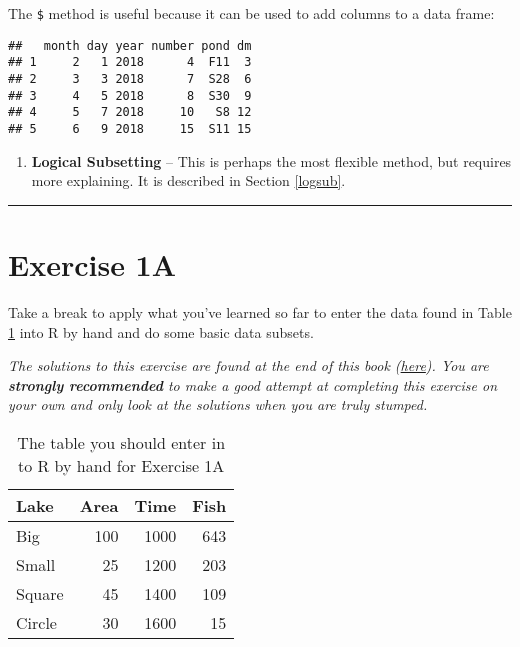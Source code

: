 \documentclass[]{book}
\newenvironment{Shaded}{\begin{snugshade}}{\end{snugshade}}
\newcommand{\StringTok}[1]{\textcolor[rgb]{0.31,0.60,0.02}{#1}}
\newcommand{\OperatorTok}[1]{\textcolor[rgb]{0.81,0.36,0.00}{\textbf{#1}}}
\newcommand{\NormalTok}[1]{#1}
\providecommand{\tightlist}{%
  \setlength{\itemsep}{0pt}\setlength{\parskip}{0pt}}
\theoremstyle{definition}
\theoremstyle{definition}
\theoremstyle{definition}
\theoremstyle{remark}
\begin{document}
The \texttt{\$} method is useful because it can be used to add columns
to a data frame:

\begin{Shaded}
\end{Shaded}

\begin{verbatim}
##   month day year number pond dm
## 1     2   1 2018      4  F11  3
## 2     3   3 2018      7  S28  6
## 3     4   5 2018      8  S30  9
## 4     5   7 2018     10   S8 12
## 5     6   9 2018     15  S11 15
\end{verbatim}

\begin{enumerate}
\def\labelenumi{\arabic{enumi}.}
\setcounter{enumi}{2}
\tightlist
\item
  \textbf{Logical Subsetting} -- This is perhaps the most flexible
  method, but requires more explaining. It is described in Section
  \ref{logsub}.
\end{enumerate}

\begin{center}\rule{0.5\linewidth}{\linethickness}\end{center}

\section*{Exercise 1A}\label{exercise-1a}

Take a break to apply what you've learned so far to enter the data found
in Table \ref{tab:ex-1-table-pdf} into R by hand and do some basic data
subsets.

\emph{The solutions to this exercise are found at the end of this book
(\protect\hyperlink{ex1a-answers}{here}). You are \textbf{strongly
recommended} to make a good attempt at completing this exercise on your
own and only look at the solutions when you are truly stumped.}

\begin{table}

\caption{\label{tab:ex-1-table-pdf}The table you should enter in to R by hand for Exercise 1A}
\centering
\begin{tabular}[t]{l|r|r|r}
\hline
Lake & Area & Time & Fish\\
\hline
Big & 100 & 1000 & 643\\
\hline
Small & 25 & 1200 & 203\\
\hline
Square & 45 & 1400 & 109\\
\hline
Circle & 30 & 1600 & 15\\
\hline
\end{tabular}
\end{table}
\end{document}
